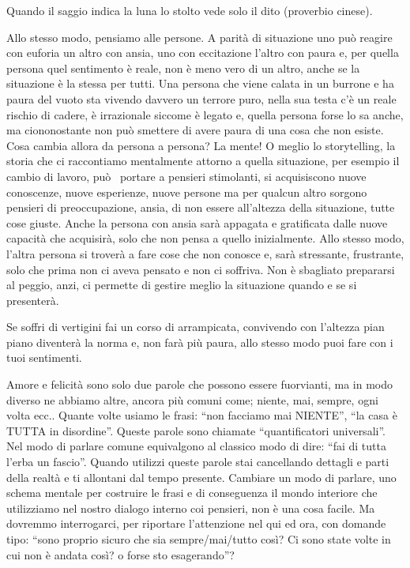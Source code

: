 \documentclass[12pt]{book} %
\begin{document}
Quando il saggio indica la luna lo stolto vede solo il dito (proverbio cinese). 

Allo stesso modo, pensiamo alle persone. A parità di situazione uno può reagire con euforia un altro con ansia, uno con
eccitazione l'altro con paura e, per quella persona quel sentimento è reale, non è meno vero di un
altro, anche se la situazione è la stessa per tutti. Una persona che viene calata in un burrone e ha paura del vuoto
sta vivendo davvero un terrore puro, nella sua testa c'è un reale rischio di cadere, è irrazionale
siccome è legato e, quella persona forse lo sa anche, ma ciononostante non può smettere di avere paura di una cosa che
non esiste. Cosa cambia allora da persona a persona? La mente! O meglio lo storytelling, la storia che ci raccontiamo
mentalmente attorno a quella situazione, per esempio il cambio di lavoro, può \ portare a pensieri stimolanti, si
acquisiscono nuove conoscenze, nuove esperienze, nuove persone ma per qualcun altro sorgono pensieri di preoccupazione,
ansia, di non essere all'altezza della situazione, tutte cose giuste. Anche la persona con ansia
sarà appagata e gratificata dalle nuove capacità che acquisirà, solo che non pensa a quello inizialmente. Allo stesso
modo, l'altra persona si troverà a fare cose che non conosce e, sarà stressante, frustrante, solo
che prima non ci aveva pensato e non ci soffriva. Non è sbagliato prepararsi al peggio, anzi, ci permette di gestire
meglio la situazione quando e se si presenterà. 

Se soffri di vertigini fai un corso di arrampicata, convivendo con l'altezza pian piano diventerà
la norma e, non farà più paura, allo stesso modo puoi fare con i tuoi sentimenti.


\bigskip

Amore e felicità sono solo due parole che possono essere fuorvianti, ma in modo diverso ne abbiamo altre, ancora più
comuni come; niente, mai, sempre, ogni volta ecc.. Quante volte usiamo le frasi: “non facciamo mai NIENTE”, “la casa è
TUTTA in disordine”. Queste parole sono chiamate “quantificatori universali”. Nel modo di parlare comune equivalgono al
classico modo di dire: “fai di tutta l'erba un fascio”. Quando utilizzi queste parole stai
cancellando dettagli e parti della realtà e ti allontani dal tempo presente. Cambiare un modo di parlare, uno schema
mentale per costruire le frasi e di conseguenza il mondo interiore che utilizziamo nel nostro dialogo interno coi
pensieri, non è una cosa facile. Ma dovremmo interrogarci, per riportare l'attenzione nel qui ed ora, con domande tipo:
“sono proprio sicuro che sia sempre/mai/tutto così? Ci sono state volte in cui non è andata così? o forse sto
esagerando”?
\end{document}

